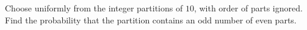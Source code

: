 Choose uniformly from the integer partitions of $10$, with order of parts ignored. Find the probability that the partition contains an odd number of even parts.
